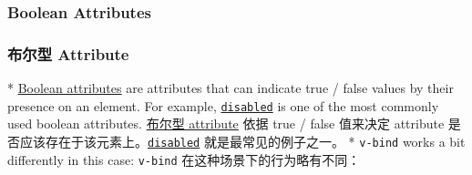 \begin{paracol}{2}
\subsubsection{Boolean Attributes}
\switchcolumn
\subsubsection{布尔型 Attribute}
\switchcolumn[0]*%
\href{https://html.spec.whatwg.org/multipage/common-microsyntaxes.html\#boolean-attributes}{Boolean
attributes} are attributes that can indicate true / false values by
their presence on an element. For example,
\href{https://developer.mozilla.org/en-US/docs/Web/HTML/Attributes/disabled}{\texttt{disabled}}
is one of the most commonly used boolean attributes.
\switchcolumn
\href{https://developer.mozilla.org/zh-CN/docs/Web/HTML/Attributes\#布尔值属性}{布尔型
attribute} 依据 true / false 值来决定 attribute
是否应该存在于该元素上。\href{https://developer.mozilla.org/en-US/docs/Web/HTML/Attributes/disabled}{\texttt{disabled}}
就是最常见的例子之一。
\switchcolumn[0]*%
\texttt{v-bind} works a bit differently in this case:
\switchcolumn
\texttt{v-bind} 在这种场景下的行为略有不同：
\end{paracol}
